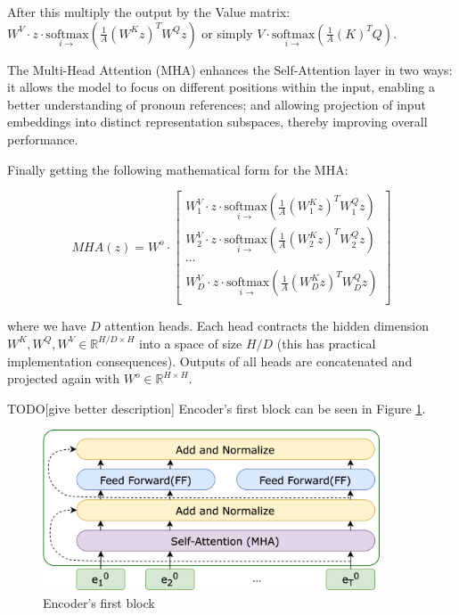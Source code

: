 \noindent After this multiply the output by the Value matrix: $W^V \cdot z \cdot \underset{i \rightarrow}{\mathrm{softmax}}\left( \frac{1}{A} \left(W^K z\right)^T W^Q z \right)$ or simply $V \cdot \underset{i \rightarrow}{\mathrm{softmax}}\left( \frac{1}{A} \left(K \right)^T Q \right)$.

The Multi-Head Attention ($\mathrm{MHA}$) enhances the Self-Attention layer in two ways: it allows the model to focus on different positions within the input, enabling a better understanding of pronoun references; and allowing projection of input embeddings into distinct representation subspaces, thereby improving overall performance.

\noindent Finally getting the following mathematical form for the $\mathrm{MHA}$:


\begin{equation}
MHA(z) =  W^o \cdot
\begin{bmatrix}
    W^V_1 \cdot z \cdot \underset{i \rightarrow}{\mathrm{softmax}}\left( \frac{1}{A} \left(W^K_1 z\right)^T W^Q_1 z \right)\\
    W^V_2 \cdot z \cdot \underset{i \rightarrow}{\mathrm{softmax}}\left( \frac{1}{A} \left(W^K_2 z\right)^T W^Q_2 z \right)\\
    \cdots\\
    W^V_D \cdot z \cdot \underset{i \rightarrow}{\mathrm{softmax}}\left( \frac{1}{A} \left(W^K_D z\right)^T W^Q_D z \right)\\
\end{bmatrix}\nonumber
\end{equation}

where we have $D$ attention heads. Each head contracts the hidden dimension $W^K, W^Q, W^V \in \mathbb{R}^{H / D \times H}$ into a space of size $H / D$ (this has practical implementation consequences). Outputs of all heads are concatenated and projected again with $W^o \in \mathbb{R}^{H \times H}$.

TODO[give better description] Encoder's first block can be seen in Figure \ref{fig:encoder_block}.

\begin{figure}[h]
    \centering
    \includegraphics[width=10cm]{pages/imgs/encoder_block.png}
    \caption{Encoder's first block}
    \label{fig:encoder_block}
\end{figure}




